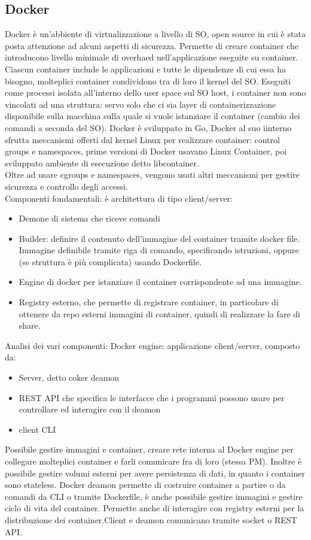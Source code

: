 \documentclass[16px]{article}
\begin{document}
\subsection{Docker}
Docker è un'abbiente di virtualizzazione a livello di SO, open source in cui è stata posta attenzione ad alcuni aspetti di sicurezza. Permette di creare container che introducono livello minimale di overhaed nell'applicazione eseguite su container.\\ Ciascun container include le applicazioni e tutte le dipendenze di cui essa ha bisogno, molteplici container condividono tra di loro il kernel del SO. Eseguiti come processi isolata all'interno dello user space sul SO host, i container non sono vincolati ad una struttura: servo solo che ci sia layer di containerizzazione disponibile sulla macchina sulla quale si vuole istanziare il container (cambio dei comandi a seconda del SO). Docker è sviluppato in Go, Docker al suo iinterno sfrutta meccanismi offerti dal kernel Linux per realizzare container: control groups e namespaces, prime versioni di Docker usavano Linux Container, poi sviluppato ambiente di esecuzione detto libcontainer.\\ Oltre ad usare cgroups e namespaces, vengono usati altri meccanismi per gestire sicurezza e controllo degli accessi.\\Componenti fondamentali: è architettura di tipo client/server:
\begin{itemize}
\item Demone di sistema che riceve comandi
\item Builder: definire il contenuto dell'immagine del container tramite docker file. Immagine definibile tramite riga di comando, specificando istruzioni, oppure (se struttura è più complicata) usando Dockerfile.
\item Engine di docker per istanziare il container corrispondente ad una immagine.
\item Registry esterno, che permette di registrare container, in particolare di ottenere da repo esterni immagini di container, quindi di realizzare la fare di share.
\end{itemize}
Analisi dei vari componenti:
Docker engine: applicazione client/server, composto da:
\begin{itemize}
\item Server, detto coker deamon
\item REST API che specifica le interfacce che i programmi possono usare per controllare ed interagire con il deamon
\item client CLI 
\end{itemize}
Possibile gestire immagini e container, creare rete interna al Docker engine per collegare molteplici container e farli comunicare fra di loro (stessa PM). Inoltre è possibile gestire volumi esterni per avere persistenza di dati, in quanto i container sono stateless.
Docker deamon permette di costruire container a partire o da comandi da CLI o tramite Dockerfile, è anche possibile gestire immagini e gestire ciclo di vita del container. Permette anche di interagire con registry esterni per la distribuzione dei container.Client e deamon comunicano tramite socket o REST API.
\end{document}
